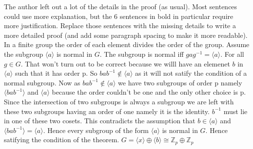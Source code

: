 \documentclass{article}
\begin{document}
\begin{enumerate}
    The author left out a lot of the details in the proof (as usual).  Most sentences could use more explanation, but the 6 sentences in bold in particular require more justification. Replace those sentences with the missing details to write a more detailed proof (and add some paragraph spacing to make it more readable).
    In a finite group the order of each element divides the order of the group. Assume the subgroup $\langle a \rangle$ is normal in $G$. The subgroup is normal iff $gag^{-1} = \langle a \rangle$. For all $g \in G$. That won't turn out to be correct because we willl have an elemenet $b$ in $\langle a \rangle$ such that it has order p. So $bab^{-1} \not \in \langle a \rangle$ as it will not satify the condition of a normal subgroup. Now as $bab^{-1} \not \in \langle a \rangle$ we have two subgroups of order p namely $\langle bab^{-1}\rangle$ and $\langle a \rangle$ because the order couldn't be one and the only other choice is p. Since the intersection of two subgroups is always a subgroup we are left with these two subgroups having an order of one namely it is the identity. $b^{-1}$ must lie in one of these two cosets. This contradicts the assumption that $b \in \langle a \rangle$ and $\langle bab^{-1}\rangle = \langle a \rangle$. Hence every subgroup of the form $\langle a \rangle$ is normal in $G$. Hence satifying the condition of the theorem. $G = \langle x \rangle \oplus \langle b \rangle \cong \mathbb{Z}_p \oplus \mathbb{Z}_{p}$
    
\end{enumerate}
\end{document}
